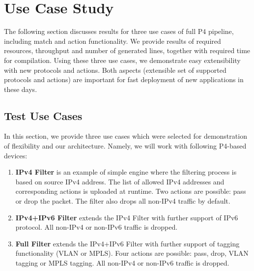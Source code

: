 \chapter{Use Case Study}
\label{chap:use-case-study}

\begin{chapterintro}
    The following section discusses results for three use cases of full P4 pipeline, including match and action functionality.  
    We provide results of required resources, throughput and number of generated lines, together with required time
    for compilation.
    Using these three use cases, we demonstrate easy extensibility with new protocols and actions.
    Both aspects (extensible set of supported protocols and actions) are important for fast deployment of new 
    applications in these days.
\end{chapterintro}

\section{Test Use Cases}

In this section, we provide three use cases which were selected for demonstration of flexibility and our architecture.
Namely, we will work with following P4-based devices:

\begin{enumerate}
     \item \textbf{IPv4 Filter} is an example of simple engine where the filtering process is based on source IPv4 address. 
     The list of allowed IPv4 addresses and corresponding actions is uploaded at runtime. 
     Two actions are possible: pass or drop the packet. The filter also drops all non-IPv4 traffic by default.    
     \item \textbf{IPv4+IPv6 Filter} extends the IPv4 Filter with further support of IPv6 protocol. All non-IPv4 or non-IPv6 traffic is dropped.
     \item \textbf{Full Filter} extends the IPv4+IPv6 Filter with further support of tagging functionality (VLAN or MPLS). 
     Four actions are possible: pass, drop, VLAN tagging or MPLS tagging. All non-IPv4 or non-IPv6 traffic is dropped.
\end{enumerate}


